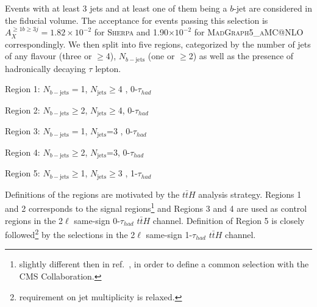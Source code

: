 Events with at least 3 jets and at least one of them being a $b$-jet are considered in the fiducial volume. 
The acceptance for events passing this selection is $A_X^{\geq1b\geq3j}=1.82\times10^{-2}$ for \textsc{Sherpa} and 1.90$\times10^{-2}$ for \textsc{MadGraph5\_aMC@NLO} correspondingly.
We then split into five regions, categorized by the number of jets of any flavour (three or  $\geq$4), $N_{b-\mathrm{jets}}$ (one or $\geq$2) as well as the presence of hadronically decaying $\tau$ lepton. 
				\begin{description}
				\item Region 1: $N_{b-\mathrm{jets}}=$1, $N_{\mathrm{jets}}\geq$4 , 0-$\tau_{had}$
				\item Region 2: $N_{b-\mathrm{jets}}\geq$2,   $N_{\mathrm{jets}}\geq$4, 0-$\tau_{had}$
				\item Region 3: $N_{b-\mathrm{jets}}=$1,  $N_{\mathrm{jets}}$=3 , 0-$\tau_{had}$
				\item Region 4: $N_{b-\mathrm{jets}}\geq$2, $N_{\mathrm{jets}}$=3, 0-$\tau_{had}$
				\item Region 5: $N_{b-\mathrm{jets}}\geq$1, $N_{\mathrm{jets}}\geq$3 , 1-$\tau_{had}$
				\end{description}
Definitions of the regions are motivated by the $t\bar{t}H$ analysis strategy.
Regions 1 and 2 corresponds to the signal regions\footnote{slightly different then in ref.~\cite{ATLAS-CONF-2019-045}, in order to define a common selection with the CMS Collaboration.} and Regions 3 and 4 are used as control regions in the 2$\ell$ same-sign  0-$\tau_{had}$ $t\bar{t}H$ channel.
Definition of Region 5 is closely followed\footnote{requirement on jet multiplicity is relaxed.} by the selections in the 2$\ell$ same-sign 1-$\tau_{had}$ $t\bar{t}H$ channel.





